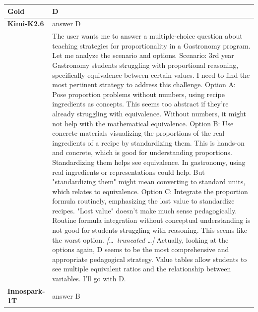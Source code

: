 \begin{longtable}{@{}l p{12.5cm}@{}}
  \textbf{Gold} & D \\
  \midrule
  \textbf{Kimi-K2.6} & answer D \\
  & The user wants me to answer a multiple-choice question about teaching strategies for proportionality in a Gastronomy program. Let me analyze the scenario and options. \newline Scenario: 3rd year Gastronomy students struggling with proportional reasoning, specifically equivalence between certain values. \newline I need to find the most pertinent strategy to address this challenge. \newline Option A: Pose proportion problems without numbers, using recipe ingredients as concepts. This seems too abstract if they're already struggling with equivalence. Without numbers, it might not help with the mathematical equivalence. \newline Option B: Use concrete materials visualizing the proportions of the real ingredients of a recipe by standardizing them. This is hands-on and concrete, which is good for understanding proportions. Standardizing them helps see equivalence. In gastronomy, using real ingredients or representations could help. But "standardizing them" might mean converting to standard units, which relates to equivalence. \newline Option C: Integrate the proportion formula routinely, emphasizing the lost value to standardize recipes. "Lost value" doesn't make much sense pedagogically. Routine formula integration without conceptual understanding is not good for students struggling with reasoning. This seems like the worst option. \newline \textit{[\ldots\ truncated \ldots]} \newline Actually, looking at the options again, D seems to be the most comprehensive and appropriate pedagogical strategy. Value tables allow students to see multiple equivalent ratios and the relationship between variables. \newline I'll go with D. \\
  \textbf{Innospark-1T} & answer B \\

\end{longtable}
